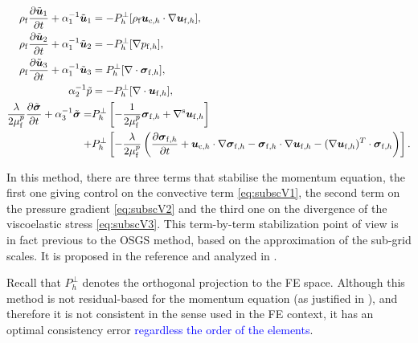 \documentclass[11pt,english]{article}
\def\ufluidh{\boldsymbol{u}_{{\rm{f}},h}}
\def\sigmafluidh{\boldsymbol{\sigma}_{{\rm{f}},h}}
\def\pfluidh{p_{{\rm{f}},h}}
\def\viscp{\mu^{p}_{\rm{f}}}
\def\alevelocityh{\boldsymbol{u}_{\mathrm{c},h}}
\begin{document}
\begin{align}
    \rho_{\rm{f}}\frac{\partial\tilde{\boldsymbol{u}}_{1}}{\partial t}+\alpha_{\text{1}}^{-1}\tilde{\boldsymbol{u}}_{1} & =-P_{h}^{\bot}[\rho_{\rm{f}}\alevelocityh\cdot\nabla\ufluidh],\label{eq:subscV1}\\
    \rho_{\rm{f}}\frac{\partial\tilde{\boldsymbol{u}}_{2}}{\partial t}+\alpha_{\text{1}}^{-1}\tilde{\boldsymbol{u}}_{2} & =-P_{h}^{\bot}[\nabla \pfluidh],\label{eq:subscV2}\\
    \rho_{\rm{f}}\frac{\partial\tilde{\boldsymbol{u}}_{3}}{\partial t}+\alpha_{\text{1}}^{-1}\tilde{\boldsymbol{u}}_{3} & =P_{h}^{\bot}[\nabla\cdot\sigmafluidh],\label{eq:subscV3}\\
    \alpha_{\text{2}}^{-1}\tilde{p} & =-P_{h}^{\bot}[\nabla\cdot\ufluidh],\label{eq:subsP}\\
    \dfrac{\lambda}{2\viscp}\dfrac{\partial\tilde{\boldsymbol{\sigma}}}{\partial t}+\alpha_{3}^{-1}\tilde{\boldsymbol{\sigma}}= & P_{h}^{\bot}\left[-\dfrac{1}{2\viscp}\sigmafluidh+\nabla^{\rm s}\ufluidh\right]\nonumber \\
    + & P_{h}^{\bot}\left[-\dfrac{\lambda}{2\viscp}\left(\dfrac{\partial\sigmafluidh}{\partial t}+\alevelocityh\cdot\nabla\sigmafluidh-\sigmafluidh\cdot\nabla\ufluidh-(\nabla\ufluidh)^{T}\cdot\sigmafluidh\right)\right].\label{eq:subsesc3}
\end{align}

{
In this method, there are three terms that stabilise the momentum equation, the first one giving control on the convective term \eqref{eq:subscV1}, the second term on the pressure gradient \eqref{eq:subscV2} and the third one on the divergence of the viscoelastic stress \eqref{eq:subscV3}. 
This term-by-term stabilization point of view is in fact previous to the OSGS method, based on the approximation of the sub-grid scales. It is proposed in the reference \cite{Codina02} and analyzed in \cite{Codina2008Oseen}.}


Recall that $P_{h}^{\bot}$ denotes the orthogonal projection to the FE space. Although this method is not residual-based for the momentum equation (as justified in \cite{moreno2020solution}), and therefore it is not consistent in the sense used in the FE context, it has an optimal consistency error \textcolor{blue}{regardless the order of the elements}.
\end{document}
